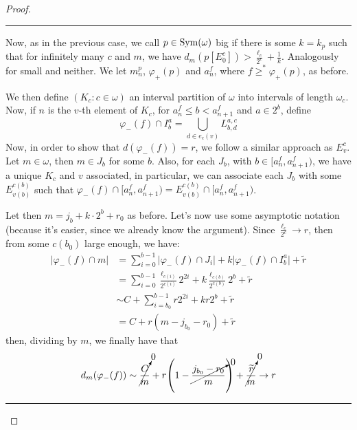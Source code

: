 \begin{proof}
    \noindent\rule{16.6cm}{0.4pt}

    Now, as in the previous case, we call $p\in\mathrm{Sym}(\omega)$ big if there is some $k=k_p$ such that for infinitely many $c$ and $m$, we have $d_m(p[E_0^c])>\frac{\ell_c}{2^c}+\frac1k$. Analogously for small and neither. We let $m_n^p$, $\varphi_+(p)$ and $a^f_n$, where $f\geq^*\varphi_+(p)$, as before.

    We then define $(K_c:c\in\omega)$ an interval partition of $\omega$ into intervals of length $\omega_c$. Now, if $n$ is the $v$-th element of $K_c$, for $a_n^f\leq b<a_{n+1}^f$ and $a\in2^b$, define
    $$\varphi_-(f)\cap I_b^a=\bigcup_{d\in e_c(v)}L_{b,d}^{a,c}$$
    Now, in order to show that $d(\varphi_-(f))=r$, we follow a similar approach as $E_v^c$. Let $m\in\omega$, then $m\in J_b$ for some $b$. Also, for each $J_b$, with $b\in[a_n^f,a_{n+1}^f)$, we have a unique $K_c$ and $v$ associated, in particular, we can associate each $J_b$ with some $E_{v(b)}^{c(b)}$ such that $\varphi_-(f)\cap[a_n^f,a_{n+1}^f)=E_{v(b)}^{c(b)}\cap[a_n^f,a_{n+1}^f)$.

    Let then $m=j_b+k\cdot 2^b+r_0$ as before. Let's now use some asymptotic notation (because it's easier, since we already know the argument). Since $\frac{\ell_c}{2^c}\to r$, then from some $c(b_0)$ large enough, we have:
    \begin{align*}
        \lvert\varphi_-(f)\cap m\rvert & = \sum_{i=0}^{b-1}\lvert\varphi_-(f)\cap J_i\rvert+k\lvert\varphi_-(f)\cap I_b^a\rvert+\widetilde{r}\\
        & =\sum_{i=0}^{b-1}\frac{\ell_{c(i)}}{2^{c(i)}}2^{2i}+k\frac{\ell_{c(b)}}{2^{c(b)}}2^b+\widetilde{r}\\
        & \sim C+\sum_{i=b_0}^{b-1}r2^{2i}+kr2^b+\widetilde{r}\\
        & = C+r(m-j_{b_0}-r_0)+\widetilde{r}
    \end{align*}
    then, dividing by $m$, we finally have that
    $$d_m(\varphi_-(f))\sim\cancelto0{\frac{C}{m}}+r{\left(1-\cancelto0{\frac{j_{b_0}-r_0}{m}}\right)}+\cancelto0{\frac{\widetilde{r}}{m}}\to r$$

    \noindent\rule{16.6cm}{0.4pt}


\end{proof}
